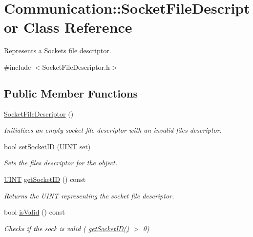 \hypertarget{class_communication_1_1_socket_file_descriptor}{}\section{Communication\+:\+:Socket\+File\+Descriptor Class Reference}
\label{class_communication_1_1_socket_file_descriptor}


Represents a Socket\textquotesingle{}s file descriptor.  




{\ttfamily \#include $<$Socket\+File\+Descriptor.\+h$>$}

\subsection*{Public Member Functions}
\begin{DoxyCompactItemize}
\item 
\hyperlink{class_communication_1_1_socket_file_descriptor_a770c8b6c9a3a47120f66ccb175afc4f3}{Socket\+File\+Descriptor} ()
\begin{DoxyCompactList}\small\item\em Initializes an empty socket file descriptor with an invalid files descriptor. \end{DoxyCompactList}\item 
bool \hyperlink{class_communication_1_1_socket_file_descriptor_ad107f96b082afa6d917acd54220f81db}{set\+Socket\+I\+D} (\hyperlink{typedefs_8h_a2e2c38961834f28c06e17e074eb00bc7}{U\+I\+N\+T} set)
\begin{DoxyCompactList}\small\item\em Sets the files descriptor for the object. \end{DoxyCompactList}\item 
\hyperlink{typedefs_8h_a2e2c38961834f28c06e17e074eb00bc7}{U\+I\+N\+T} \hyperlink{class_communication_1_1_socket_file_descriptor_a9f7c9de3b232bf172a4db62a3d4c6cac}{get\+Socket\+I\+D} () const 
\begin{DoxyCompactList}\small\item\em Returns the U\+I\+N\+T representing the socket file descriptor. \end{DoxyCompactList}\item 
bool \hyperlink{class_communication_1_1_socket_file_descriptor_acd3712f2ad189c2bc96d516b6a329e1d}{is\+Valid} () const 
\begin{DoxyCompactList}\small\item\em Checks if the sock is valid ( \hyperlink{class_communication_1_1_socket_file_descriptor_a9f7c9de3b232bf172a4db62a3d4c6cac}{get\+Socket\+I\+D()} $>$ 0) \end{DoxyCompactList}\end{DoxyCompactItemize}
